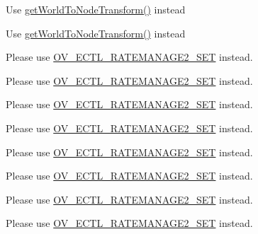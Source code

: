 \begin{DoxyRefList}
Use \hyperlink{classNode_ab41da5111de6d98710d0497e35063989}{get\+World\+To\+Node\+Transform()} instead 

Use \hyperlink{classNode_ab41da5111de6d98710d0497e35063989}{get\+World\+To\+Node\+Transform()} instead  
\item[\label{deprecated__deprecated000184}%
\Hypertarget{deprecated__deprecated000184}%
Member \hyperlink{cocos2d_2external_2win10-specific_2OggDecoder_2include_2vorbis_2vorbisenc_8h_a34c3170d227b6368041e59c1dc7ed6e4}{O\+V\+\_\+\+E\+C\+T\+L\+\_\+\+R\+A\+T\+E\+M\+A\+N\+A\+G\+E\+\_\+\+A\+VG} ]Please use \hyperlink{_2cocos2d_2external_2win32-specific_2OggDecoder_2include_2vorbis_2vorbisenc_8h_a5075e0acb85fd45398a290594f83d6ba}{O\+V\+\_\+\+E\+C\+T\+L\+\_\+\+R\+A\+T\+E\+M\+A\+N\+A\+G\+E2\+\_\+\+S\+ET} instead.

Please use \hyperlink{_2cocos2d_2external_2win32-specific_2OggDecoder_2include_2vorbis_2vorbisenc_8h_a5075e0acb85fd45398a290594f83d6ba}{O\+V\+\_\+\+E\+C\+T\+L\+\_\+\+R\+A\+T\+E\+M\+A\+N\+A\+G\+E2\+\_\+\+S\+ET} instead.

Please use \hyperlink{_2cocos2d_2external_2win32-specific_2OggDecoder_2include_2vorbis_2vorbisenc_8h_a5075e0acb85fd45398a290594f83d6ba}{O\+V\+\_\+\+E\+C\+T\+L\+\_\+\+R\+A\+T\+E\+M\+A\+N\+A\+G\+E2\+\_\+\+S\+ET} instead.

Please use \hyperlink{_2cocos2d_2external_2win32-specific_2OggDecoder_2include_2vorbis_2vorbisenc_8h_a5075e0acb85fd45398a290594f83d6ba}{O\+V\+\_\+\+E\+C\+T\+L\+\_\+\+R\+A\+T\+E\+M\+A\+N\+A\+G\+E2\+\_\+\+S\+ET} instead.

Please use \hyperlink{_2cocos2d_2external_2win32-specific_2OggDecoder_2include_2vorbis_2vorbisenc_8h_a5075e0acb85fd45398a290594f83d6ba}{O\+V\+\_\+\+E\+C\+T\+L\+\_\+\+R\+A\+T\+E\+M\+A\+N\+A\+G\+E2\+\_\+\+S\+ET} instead.

Please use \hyperlink{_2cocos2d_2external_2win32-specific_2OggDecoder_2include_2vorbis_2vorbisenc_8h_a5075e0acb85fd45398a290594f83d6ba}{O\+V\+\_\+\+E\+C\+T\+L\+\_\+\+R\+A\+T\+E\+M\+A\+N\+A\+G\+E2\+\_\+\+S\+ET} instead.

Please use \hyperlink{_2cocos2d_2external_2win32-specific_2OggDecoder_2include_2vorbis_2vorbisenc_8h_a5075e0acb85fd45398a290594f83d6ba}{O\+V\+\_\+\+E\+C\+T\+L\+\_\+\+R\+A\+T\+E\+M\+A\+N\+A\+G\+E2\+\_\+\+S\+ET} instead.

Please use \hyperlink{_2cocos2d_2external_2win32-specific_2OggDecoder_2include_2vorbis_2vorbisenc_8h_a5075e0acb85fd45398a290594f83d6ba}{O\+V\+\_\+\+E\+C\+T\+L\+\_\+\+R\+A\+T\+E\+M\+A\+N\+A\+G\+E2\+\_\+\+S\+ET} instead.


\end{DoxyRefList}
